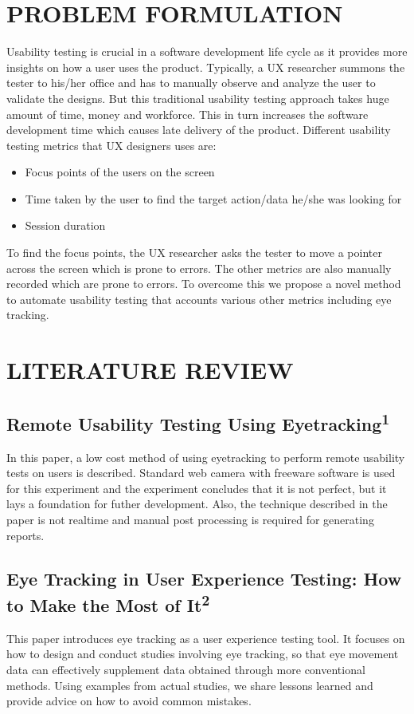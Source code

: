 \documentclass[12pt,a4paper,final]{extreport}
\begin{document}
\chapter{PROBLEM FORMULATION}
\vspace{0.3cm}
Usability testing is crucial in a software development life cycle as it provides more insights
on how a user uses the product. Typically, a UX researcher summons the tester to his/her office
and has to manually observe and analyze the user to validate the designs. But this traditional
usability testing approach takes huge amount of time, money and workforce. This in turn
increases the software development time which causes late delivery of the product. Different
usability testing metrics that UX designers uses are:
\begin{itemize}
    \item Focus points of the users on the screen
    \item Time taken by the user to find the target action/data he/she was looking for
    \item Session duration
\end{itemize}
To find the focus points, the UX researcher asks the tester to move a pointer across the
screen which is prone to errors. The other metrics are also manually recorded which are prone
to errors. To overcome this we propose a novel method to automate usability testing that accounts
various other metrics including eye tracking.


\newpage
\chapter{LITERATURE REVIEW}
\section{Remote Usability Testing Using Eyetracking\textsuperscript{1}}
In this paper, a low cost method of using eyetracking to perform remote usability tests on users is described. Standard web camera with freeware software is used for this experiment and the experiment concludes that it is not perfect, but it lays a foundation for futher development. Also, the technique described in the paper is not realtime and manual post processing is required for generating reports.

\section{Eye Tracking in User Experience Testing:
How to Make the Most of It\textsuperscript{2}}
This paper introduces eye tracking as a user experience testing tool. It focuses on how to design and conduct studies involving eye tracking, so that eye movement data can effectively supplement data obtained through more conventional methods. Using examples from actual studies, we share lessons learned and provide advice on how to avoid common mistakes. 
\end{document}
